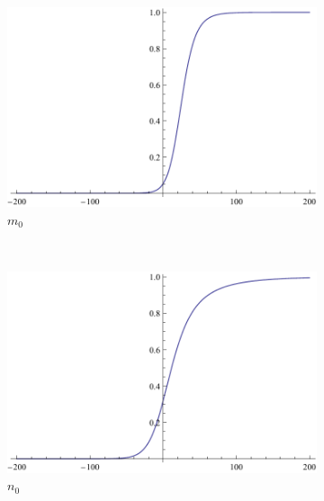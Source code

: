 \documentclass{article}
\numberwithin{equation}{section}
\begin{document}
    \begin{figure}[H]
        \centering
        \begin{subfigure}[t]{0.3\textwidth}
            \includegraphics[width=\textwidth]{./schemas/m0.pdf}
            \caption{$m_0$}
        \end{subfigure}
        ~ %
        \begin{subfigure}[t]{0.3\textwidth}
            \includegraphics[width=\textwidth]{./schemas/n0.pdf}
            \caption{$n_0$}
        \end{subfigure}
        ~ %
        \begin{subfigure}[t]{0.3\textwidth}

\end{subfigure}
\end{figure}
\end{document}
